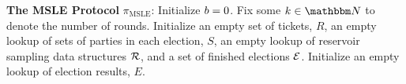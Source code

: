 \centering
\begin{mdframed}
	\textbf{The MSLE Protocol} $\pi_{\text{MSLE}}$:
	Initialize $b = 0$. Fix some $k \in \N$ to denote the number of rounds.
	Initialize an empty set of tickets, $R$, an empty lookup of sets of parties in each election, $S$,
	an empty lookup of reservoir sampling data structures $\mathcal{R}$,
	and a set of finished elections $\mathcal{E}$. Initialize an empty lookup of election results, $E$.

	\begin{itemize}




\end{itemize}
\end{mdframed}
